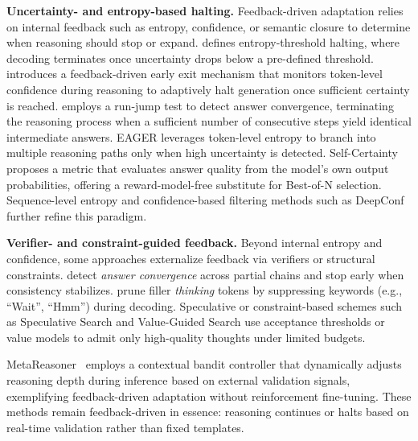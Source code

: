 \documentclass[11pt]{article}
\begin{document}
\textbf{Uncertainty- and entropy-based halting.}
Feedback-driven adaptation relies on internal feedback such as entropy, confidence, or semantic closure to determine when reasoning should stop or expand.
\citet{laaouach2025halt} defines entropy-threshold halting, where decoding terminates once uncertainty drops below a pre-defined threshold.
\citet{Yang2025DEER} introduces a feedback-driven early exit mechanism that monitors token-level confidence during reasoning to adaptively halt generation once sufficient certainty is reached.
\citet{mao2025earlystoppingchainofthoughtslarge} 
employs a run-jump test to detect answer convergence, terminating the reasoning process when a sufficient number of consecutive steps yield identical intermediate answers.
{EAGER} \citep{Scalena2025EAGER} leverages token-level entropy to branch into multiple reasoning paths only when high uncertainty is detected. {Self-Certainty} \citep{Kang2025SelfCertainty} proposes a metric that evaluates answer quality from the model’s own output probabilities, offering a reward-model-free substitute for Best-of-N selection.
Sequence-level entropy 
\citep{zhu2025uncertainty,sharma2025think} and confidence-based filtering methods such as DeepConf\citep{Fu2025DeepConf} further refine this paradigm. 

\textbf{Verifier- and constraint-guided feedback.}
Beyond internal entropy and confidence, some approaches externalize feedback via verifiers or structural constraints.
\citet{liu2025answerconvergence} detect \emph{answer convergence} across partial chains and stop early when consistency stabilizes.
\citet{wang2025nowait} prune filler \emph{thinking} tokens by suppressing keywords (e.g., ``Wait'', ``Hmm'') during decoding.
Speculative or constraint-based schemes such as {Speculative Search} \citep{wang2025specreasoning} and {Value-Guided Search} \citep{wang2025valueguided} use acceptance thresholds or value models to admit only high-quality thoughts under limited budgets. 



MetaReasoner~\citep{sui2025metareasonerdynamicguidanceoptimized} employs a contextual bandit controller that dynamically adjusts reasoning depth during inference based on external validation signals, exemplifying feedback-driven adaptation without reinforcement fine-tuning.
These methods remain feedback-driven in essence: reasoning continues or halts based on real-time validation rather than fixed templates.
\end{document}
